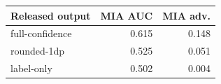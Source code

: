 \begin{tabular}{lrr}
\toprule
Released output & MIA AUC & MIA adv. \\
\midrule
full-confidence & 0.615 & 0.148 \\
rounded-1dp & 0.525 & 0.051 \\
label-only & 0.502 & 0.004 \\
\bottomrule
\end{tabular}
